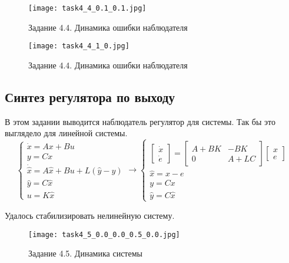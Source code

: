 \begin{figure}[]
    \centering
    \texttt{[image: task4\_4\_0.1\_0.1.jpg]}
    \caption{Задание 4.4. Динамика ошибки наблюдателя}
    \label{fig:task4_4_2}
\end{figure}

\begin{figure}[]
    \centering
    \texttt{[image: task4\_4\_1\_0.jpg]}
    \caption{Задание 4.4. Динамика ошибки наблюдателя}
    \label{fig:task4_4_3}
\end{figure}


\subsection{Синтез регулятора по выходу}
В этом задании выводится наблюдатель регулятор для системы. Так бы это выглядело для линейной системы.
\[
        \begin{cases}
                \dot{x} = A x + B u\\
                y = C x \\
                \dot{\hat{x}} = A \hat{x} + B u + L(\hat{y} - y) \\
                \hat{y} = C \hat{x} \\
                u = K \hat{x}
        \end{cases} \rightarrow
        \begin{cases}
            \begin{bmatrix} 
                \dot{x} \\
                \dot{e}
            \end{bmatrix} = 
            \begin{bmatrix} 
                A + BK & -BK\\
                0 & A + LC
            \end{bmatrix}
            \begin{bmatrix} 
              x \\
              e
          \end{bmatrix} 
            \\
            \hat{x} = x - e \\
            y = Cx \\
            \hat{y} = C \hat{x}
         \end{cases}
\]

Удалось стабилизировать нелинейную систему.
\begin{figure}[]
    \centering
    \texttt{[image: task4\_5\_0.0\_0.0\_0.5\_0.0.jpg]}
    \caption{Задание 4.5. Динамика системы}
    \label{fig:task4_5}
\end{figure}


